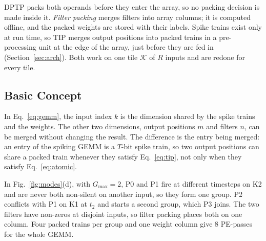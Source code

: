 DPTP packs both operands before they enter the array, so no packing decision is made inside it. \emph{Filter
packing} merges filters into array columns; it is computed offline, and the packed weights are stored with their
labels. Spike trains exist only at run time, so TIP merges output positions into packed trains in a pre-processing
unit at the edge of the array, just before they are fed in (Section~\ref{sec:arch}). Both work on one tile
$\mathcal{K}$ of $R$ inputs and are redone for every tile.

\subsection{Basic Concept}
\label{sec:pack-concept}
In Eq.~\eqref{eq:gemm}, the input index $k$ is the dimension shared by the spike trains and the weights. The other
two dimensions, output positions $m$ and filters $n$, can be merged without changing the result. The difference is the entry being merged: an entry of the spiking GEMM is a $T$-bit
spike train, so two output positions can share a packed train whenever they satisfy Eq.~\eqref{eq:tip}, not only
when they satisfy Eq.~\eqref{eq:atomic}.

In Fig.~\ref{fig:modes}(d), with $G_{\max} = 2$, P0 and P1 fire at different timesteps on K2 and are never both
non-silent on another input, so they form one group. P2 conflicts with P1 on K1 at $t_2$ and starts a second
group, which P3 joins. The two filters have non-zeros at disjoint inputs, so filter packing places both on one
column. Four packed trains per group and one weight column give 8 PE-passes for the whole GEMM.

